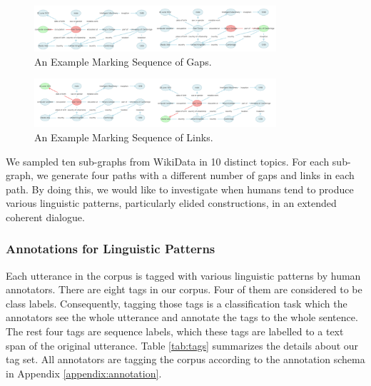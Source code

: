 \documentclass[bsc,frontabs,twoside,singlespacing,parskip,deptreport]{infthesis}     %
\begin{document}
\begin{figure}[h]
    \centering
    \includegraphics[width=0.8\textwidth]{gaps.png}
    \caption{An Example Marking Sequence of Gaps.}
    \label{fig:gaps}
\end{figure}

\begin{figure}[h]
    \centering
    \includegraphics[width=0.8\textwidth]{links.png}
    \caption{An Example Marking Sequence of Links.}
    \label{fig:links}
\end{figure}

We sampled ten sub-graphs from WikiData in 10 distinct topics. For each sub-graph, we generate four paths with a different number of gaps and links in each path. By doing this, we would like to investigate when humans tend to produce various linguistic patterns, particularly elided constructions, in an extended coherent dialogue.


\subsubsection*{Annotations for Linguistic Patterns}

Each utterance in the corpus is tagged with various linguistic patterns by human annotators. There are eight tags in our corpus. Four of them are considered to be class labels. Consequently, tagging those tags is a classification task which the annotators see the whole utterance and annotate the tags to the whole sentence. The rest four tags are sequence labels, which these tags are labelled to a text span of the original utterance. Table \ref{tab:tags} summarizes the details about our tag set. All annotators are tagging the corpus according to the annotation schema in Appendix \ref{appendix:annotation}.

\end{document}
